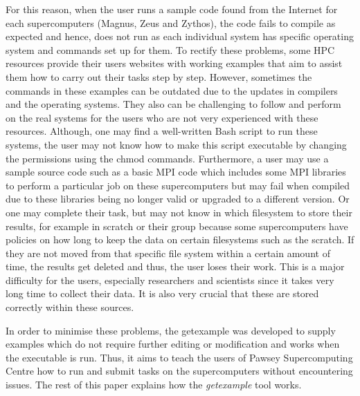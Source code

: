 For this reason, when the user runs a sample code found from the Internet for each supercomputers (Magnus, Zeus and Zythos), the code fails to compile 
as expected and hence, does not run as each individual system has specific operating system and commands set up for them. To rectify these problems, 
some HPC resources provide their users websites with working examples that aim to assist them how to carry out their tasks step by step. 
However, sometimes the commands in these examples can be outdated due to the updates in compilers and the operating systems. They also can be challenging 
to follow and perform on the real systems for the users who are not very experienced with these resources. Although, one may find a well-written Bash 
script to run these systems, the user may not know how to make this script executable by changing the permissions using the chmod commands. Furthermore, a user 
may use a sample source code such as a basic MPI code which includes some MPI libraries to perform a particular job on these supercomputers but may 
fail when compiled due to these libraries being no longer valid or upgraded to a different version. Or one may complete their task, but may 
not know in which filesystem to store their results, for example in scratch or their group because some supercomputers have policies on how long to keep 
the data on certain filesystems such as the scratch. If they are not moved from that specific file system within a certain amount of time, the results get 
deleted and thus, the user loses their work. This is a major difficulty for the users, especially researchers and scientists since it takes very long time 
to collect their data. It is also very crucial that these are stored correctly within these sources.

In order to minimise these problems, the getexample was developed to supply examples which do not require further editing or modification and works
when the executable is run. Thus, it aims to teach the users of Pawsey Supercomputing Centre how to run and submit tasks on the supercomputers without 
encountering issues. The rest of this paper explains how the \emph{getexample} tool works.   




